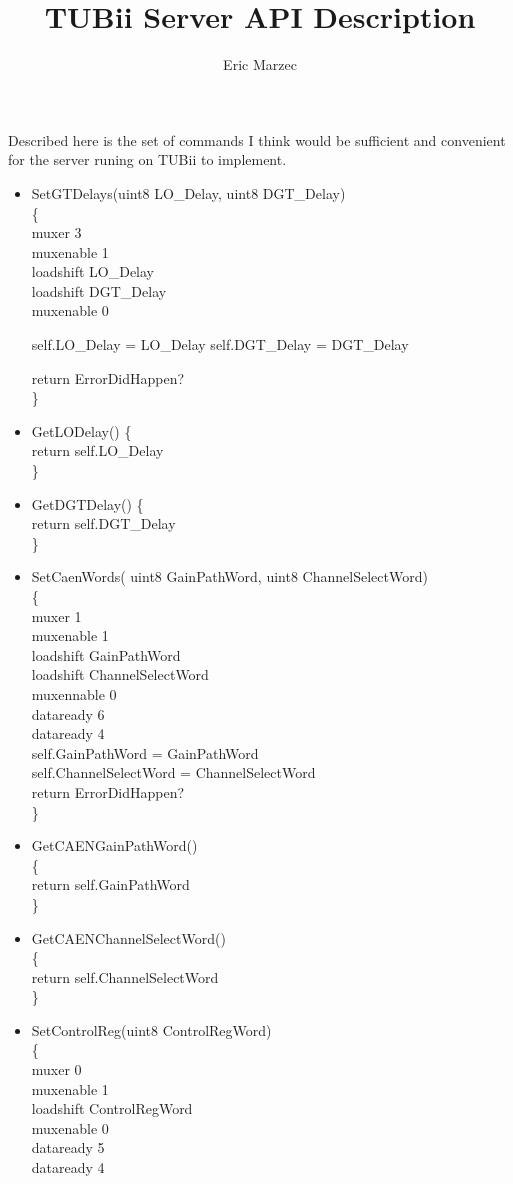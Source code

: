 \documentclass[12pt,a4paper]{article}
\author{Eric Marzec}
\title{TUBii Server API Description}
\begin{document}
\maketitle
Described here is the set of commands I think would be sufficient and convenient for the server runing on TUBii to implement.
\begin{itemize}
\item
SetGTDelays(uint8 LO\_Delay, uint8 DGT\_Delay)\\
\{\\
muxer 3\\
muxenable 1\\
loadshift LO\_Delay\\
loadshift DGT\_Delay\\
muxenable 0

self.LO\_Delay = LO\_Delay
self.DGT\_Delay = DGT\_Delay

return ErrorDidHappen?\\
\}
\item 
GetLODelay()
\{\\
  return self.LO\_Delay\\
\}
\item
GetDGTDelay()
\{\\
  return self.DGT\_Delay\\
\}
\item
SetCaenWords( uint8 GainPathWord, uint8 ChannelSelectWord)\\
\{\\
muxer 1 \\
muxenable 1 \\
loadshift GainPathWord \\
loadshift ChannelSelectWord \\
muxennable 0\\
dataready 6\\
dataready 4\\

self.GainPathWord = GainPathWord\\
self.ChannelSelectWord = ChannelSelectWord\\

	return ErrorDidHappen?\\
\}\\
\item 
GetCAENGainPathWord()\\
\{\\
  return self.GainPathWord\\
\}\\
\item
GetCAENChannelSelectWord()\\
\{\\
  return self.ChannelSelectWord\\
\}\\
\item
SetControlReg(uint8 ControlRegWord)\\
\{\\
muxer 0\\
muxenable 1\\
loadshift ControlRegWord\\
muxenable 0\\
dataready 5\\
dataready 4\\


\end{itemize}
\end{document}
